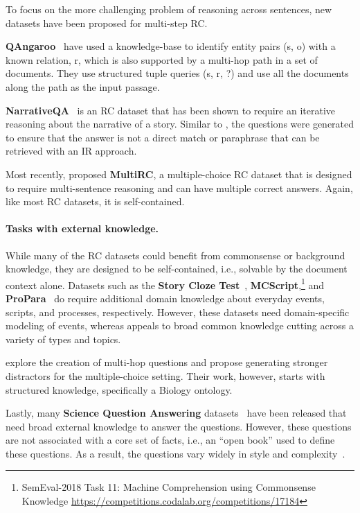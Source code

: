 To focus on the more challenging problem of reasoning across sentences, new datasets have been proposed for multi-step RC.

\textbf{QAngaroo}~\citep{QAngaroo:Welbl2017ConstructingDF} have used a knowledge-base to identify entity pairs (s, o) with a known relation, r, which is also supported by a multi-hop path in a set of documents. They use structured tuple queries (s, r, ?) and use all the documents along the path as the input passage.    

\textbf{NarrativeQA}~\citep{NarrativeQADeepMind2017} is an RC dataset that has been shown to require an iterative reasoning about the narrative of a story. Similar to \obqa, the questions were generated to ensure that the answer is not a direct match or paraphrase that can be retrieved with an IR approach. 

Most recently, \citet{MultiRCKhashabi2018} proposed \textbf{MultiRC}, a multiple-choice RC dataset that is designed to require multi-sentence reasoning and can have multiple correct answers. Again, like most RC datasets, it is self-contained.

\paragraph{Tasks with external knowledge.} While many of the RC datasets could benefit from commonsense or background knowledge, they are designed to be self-contained, i.e., solvable by the document context alone. Datasets such as the \textbf{Story Cloze Test}~\cite{Mostafazadeh2016AStories}, \textbf{MCScript},\footnote{SemEval-2018 Task 11: Machine Comprehension using Commonsense Knowledge \url{https://competitions.codalab.org/competitions/17184}} and \textbf{ProPara}~\cite{Propara:Mishra2018TrackingSC} do require additional domain knowledge about everyday events, scripts, and processes, respectively. However, these datasets need domain-specific modeling of events, whereas \obqa appeals to broad common knowledge cutting across a variety of types and topics.

\citet{Stasaski2017MultipleCQ} explore the creation of multi-hop questions and propose generating stronger distractors for the multiple-choice setting. Their work, however, starts with structured knowledge, specifically a Biology ontology.

Lastly, many \textbf{Science Question Answering} datasets~\cite[e.g.][]{clark2016combining,ARCClark2018} have been released that need broad external knowledge to answer the questions. However, these questions are not associated with a core set of facts, i.e., an  ``open book'' used to define these questions. As a result, the questions vary widely in style and complexity~\cite{ARCClark2018}.

